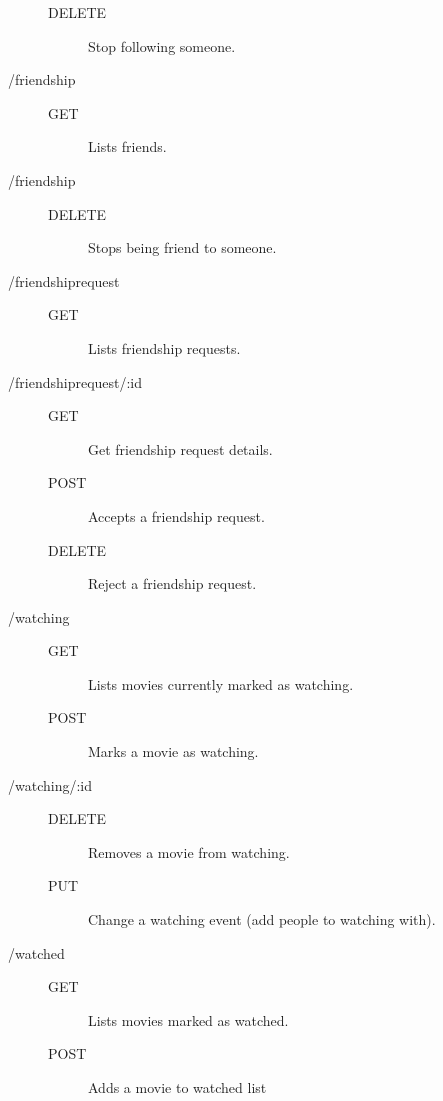 \begin{description}
    \begin{description}
      \item [DELETE] Stop following someone.
    \end{description}
  \item [/friendship] \hfill
    \begin{description}
      \item [GET] Lists friends.
    \end{description}
  \item [/friendship] \hfill
    \begin{description}
      \item [DELETE] Stops being friend to someone.
    \end{description}
  \item [/friendshiprequest] \hfill
    \begin{description}
      \item [GET] Lists friendship requests.
    \end{description}
  \item [/friendshiprequest/:id] \hfill
    \begin{description}
      \item [GET] Get friendship request details.
      \item [POST] Accepts a friendship request.
      \item [DELETE] Reject a friendship request.
    \end{description}
  \item [/watching] \hfill
    \begin{description}
      \item [GET] Lists movies currently marked as watching.
      \item [POST] Marks a movie as watching.
    \end{description}
  \item [/watching/:id] \hfill
    \begin{description}
      \item [DELETE] Removes a movie from watching.
      \item [PUT] Change a watching event (add people to watching with).
    \end{description}
  \item [/watched] \hfill
    \begin{description}
      \item [GET] Lists movies marked as watched.
      \item [POST] Adds a movie to watched list

\end{description}
\end{description}
